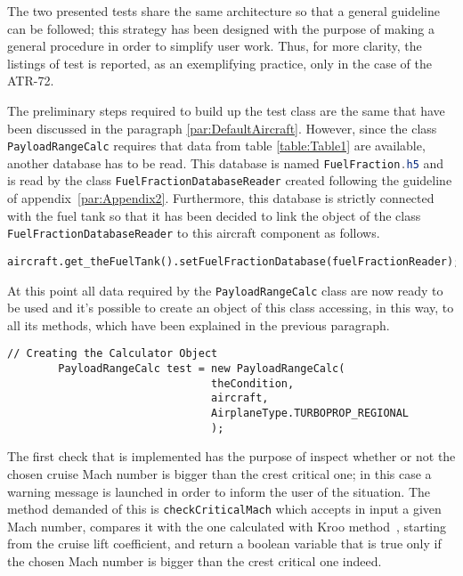 \bigskip
\noindent
The two presented tests share the same architecture so that a general guideline can be followed; this strategy has been designed with the purpose of making a general procedure in order to simplify user work. Thus, for more clarity, the listings of test is reported, as an 	exemplifying practice, only in the case of the ATR-72. 

\bigskip
\noindent
The preliminary steps required to build up the test class are the same that have been discussed in the paragraph \ref{par:DefaultAircraft}. However, since the class \lstinline[language=Java]!PayloadRangeCalc! requires that data from table \ref{table:Table1} are available, another database has to be read. This database is named \lstinline[language=Java]!FuelFraction.h5! and is read by the class \lstinline[language=Java]!FuelFractionDatabaseReader! created following the guideline of appendix~\ref{par:Appendix2}.
%
Furthermore, this database is strictly connected with the fuel tank so that it has been decided to link the object of the class \lstinline[language=Java]!FuelFractionDatabaseReader! to this aircraft component as follows.

\bigskip
\begin{lstlisting}[caption={Attachment of the \lstinline!FuelFractionDatabaseReader! to the fuel tank component of the aircraft}, captionpos=b, tabsize=2]
		aircraft.get_theFuelTank().setFuelFractionDatabase(fuelFractionReader);
\end{lstlisting}
%
At this point all data required by the \lstinline[language=Java]!PayloadRangeCalc! class are now ready to be used and it’s possible to create an object of this class accessing, in this way, to all its methods, which have been explained in the previous paragraph. 

\bigskip
\begin{lstlisting}[caption={Excerpt of the ATR-72 Payload-Range test - Payload-Range class instance creation}, captionpos=b, tabsize=2]
		// Creating the Calculator Object
		PayloadRangeCalc test = new PayloadRangeCalc(
								theCondition, 
								aircraft,
								AirplaneType.TURBOPROP_REGIONAL
								);
\end{lstlisting}

\bigskip
\noindent
The first check that is implemented has the purpose of inspect whether or not the chosen cruise Mach number is bigger than the crest critical one; in this case a warning message is launched in order to inform the user of the situation. The method demanded of this is \lstinline[language=Java]!checkCriticalMach! which accepts in input a given Mach number, compares it with the one calculated with Kroo method~\cite{Ciornei:CriticalMach}, starting from the cruise lift coefficient, and return a boolean variable that is true only if the chosen Mach number is bigger than the crest critical one indeed. 

